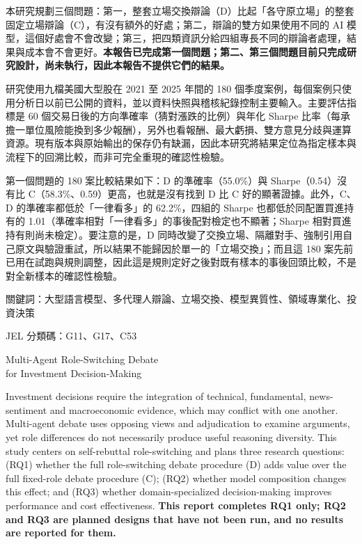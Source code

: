 \documentclass[12pt,a4paper]{article}
\numberwithin{table}{section}
\numberwithin{figure}{section}
\begin{document}
本研究規劃三個問題：第一，整套立場交換辯論（D）比起「各守原立場」的整套固定立場辯論（C），有沒有額外的好處；第二，辯論的雙方如果使用不同的 AI 模型，這個好處會不會改變；第三，把四類資訊分給四組專長不同的辯論者處理，結果與成本會不會更好。\textbf{本報告已完成第一個問題；第二、第三個問題目前只完成研究設計，尚未執行，因此本報告不提供它們的結果。}

研究使用九檔美國大型股在 2021 至 2025 年間的 180 個季度案例，每個案例只使用分析日以前已公開的資料，並以資料快照與稽核紀錄控制主要輸入。主要評估指標是 60 個交易日後的方向準確率（猜對漲跌的比例）與年化 Sharpe 比率（每承擔一單位風險能換到多少報酬），另外也看報酬、最大虧損、雙方意見分歧與運算資源。現有版本與原始輸出的保存仍有缺漏，因此本研究將結果定位為指定樣本與流程下的回溯比較，而非可完全重現的確認性檢驗。

第一個問題的 180 案比較結果如下：D 的準確率（55.0\%）與 Sharpe（0.54）沒有比 C（58.3\%、0.59）更高，也就是沒有找到 D 比 C 好的顯著證據。此外，C、D 的準確率都低於「一律看多」的 62.2\%，四組的 Sharpe 也都低於同配置買進持有的 1.01（準確率相對「一律看多」的事後配對檢定也不顯著；Sharpe 相對買進持有則尚未檢定）。要注意的是，D 同時改變了交換立場、隔離對手、強制引用自己原文與驗證重試，所以結果不能歸因於單一的「立場交換」；而且這 180 案先前已用在試跑與規則調整，因此這是規則定好之後對既有樣本的事後回頭比較，不是對全新樣本的確認性檢驗。

\vspace{0.6cm}
\noindent 關鍵詞：大型語言模型、多代理人辯論、立場交換、模型異質性、領域專業化、投資決策

\noindent JEL 分類碼：G11、G17、C53
\clearpage
\begin{center}{\fontsize{16}{24}\selectfont Multi-Agent Role-Switching Debate\\ for Investment Decision-Making\par}\end{center}
\noindent Investment decisions require the integration of technical, fundamental, news-sentiment and macroeconomic evidence, which may conflict with one another. Multi-agent debate uses opposing views and adjudication to examine arguments, yet role differences do not necessarily produce useful reasoning diversity. This study centers on self-rebuttal role-switching and plans three research questions: (RQ1) whether the full role-switching debate procedure (D) adds value over the full fixed-role debate procedure (C); (RQ2) whether model composition changes this effect; and (RQ3) whether domain-specialized decision-making improves performance and cost effectiveness. \textbf{This report completes RQ1 only; RQ2 and RQ3 are planned designs that have not been run, and no results are reported for them.}
\end{document}
